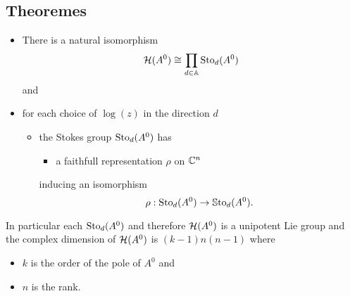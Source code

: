 \subsection{Theoremes}
\begin{thm}
  \begin{itemize}
    \item There is a natural isomorphism
      \[
        \mathcal{H}(A^0)\cong\prod_{d\in\mathbb{A}}\operatorname{Sto}_d(A^0)
      \]
      and
    \item for each choice of $\log(z)$ in the direction $d$
      \begin{itemize}
        \item the Stokes group $\operatorname{Sto}_d(A^0)$ has
          \begin{itemize}
            \item a faithfull representation $\rho$ on $\mathbb{C}^n$
          \end{itemize}
          inducing an isomorphism
          \[
            \rho:\operatorname{Sto}_d(A^0)\to\operatorname{\mathbb{S}to}_d(A^0).
          \]
      \end{itemize}
  \end{itemize}
  In particular each $\operatorname{Sto}_d(A^0)$ and therefore $\mathcal{H}(A^0)$ is a unipotent Lie
  group and the complex dimension of $\mathcal{H}(A^0)$ is $(k-1)n(n-1)$ where
  \begin{itemize}
    \item $k$ is the order of the pole of $A^0$ and
    \item $n$ is the rank.
  \end{itemize}
\end{thm}
